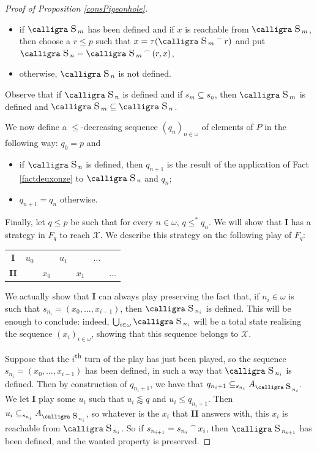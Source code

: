\documentclass[a4paper,11pt]{article}
\theoremstyle{definition}
\numberwithin{equation}{section}
\newcommand{\X}{\mathcal{X}}
\newcommand{\I}{\textbf{I}}
\newcommand{\II}{\textbf{II}}
\newcommand{\st}{\text{{\calligra \LARGE s}}\,}
\newcommand{\Asti}[1]{A_{{\text{{\calligra \Large s}}\,}_{#1}}}
\newcommand{\concat}{%
  \mathbin{\raisebox{1ex}{\scalebox{.7}{$\frown$}}}%
}
\begin{document}
\begin{proof}[Proof of Proposition \ref{consPigeonhole}]
\begin{itemize}

\item if $\st_m$ has been defined and if $x$ is reachable from $\st_m$, then choose a $r \leqslant p$ such that $x = \tau(\st_m \concat r)$ and put $\st_n = \st_m \concat (r, x)$,

\item otherwise, $\st_n$ is not defined.

\end{itemize}

\noindent Observe that if $\st_n$ is defined and if $s_m \subseteq s_n$, then $\st_m$ is defined and $\st_m \subseteq \st_n$.

\smallskip

We now define a $\leqslant$-decreasing sequence $(q_n)_{n \in \omega}$ of elements of $P$ in the following way: $q_0 = p$ and

\begin{itemize}

\item if $\st_n$ is defined, then $q_{n + 1}$ is the result of the application of Fact \ref{factdeuxonze} to $\st_n$ and $q_n$;

\item $q_{n + 1} = q_n$ otherwise.

\end{itemize}

Finally, let $q \leqslant p$ be such that for every $n \in \omega$, $q \leqslant^* q_n$. We will show that \I{} has a strategy in $F_q$ to reach $\X$. We describe this strategy on the following play of $F_q$:

\smallskip

\begin{tabular}{ccccccc}
\textbf{I} & $u_0$ & & $u_1$ & & $\hdots$ & \\
\textbf{II} & & $x_0$ & & $x_1$ & & $\hdots$ 
\end{tabular}

\smallskip

\noindent We actually show that \I{} can always play preserving the fact that, if $n_i \in \omega$ is such that $s_{n_i} = (x_0, \ldots, x_{i - 1})$, then $\st_{n_i}$ is defined. This will be enough to conclude: indeed, $\bigcup_{i \in \omega} \st_{n_i}$ will be a total state realising the sequence $(x_i)_{i \in \omega}$, showing that this sequence belongs to $\X$.

\smallskip

Suppose that the $i$\textsuperscript{th} turn of the play has just been played, so the sequence $s_{n_i} = (x_0, \ldots, x_{i - 1})$ has been defined, in such a way that $\st_{n_i}$ is defined. Then by construction of $q_{n_i + 1}$, we have that $q_{n_i + 1} \subseteq_{s_{n_i}} \Asti{n_i}$. We let \I{} play some $u_i$ such that $u_i \lessapprox q$ and $u_i \leqslant q_{n_i + 1}$. Then $u_i \subseteq_{s_{n_i}} \Asti{n_i}$, so whatever is the $x_i$ that \II{} answers with, this $x_i$ is reachable from $\st_{n_i}$. So if $s_{n_{i+ 1}} = s_{n_i} \concat x_i$, then $\st_{n_{i + 1}}$ has been defined, and the wanted property is preserved.


\end{proof}
\end{document}
